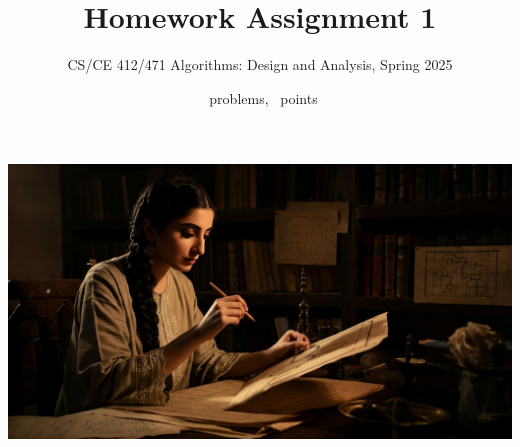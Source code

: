 \documentclass[a4paper]{exam}
\title{Homework Assignment 1}
\author{CS/CE 412/471 Algorithms: Design and Analysis, Spring 2025}
\date{\numquestions\ problems, \numpoints\ points}
\begin{document}
\maketitle
\thispagestyle{empty}

\includegraphics[trim=0 5cm 0 1cm, clip, width=\textwidth]{title}
\end{document}
